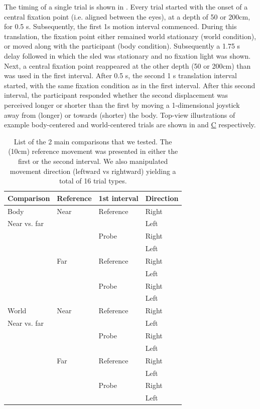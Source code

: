 The timing of a single trial is shown in . Every trial started with the onset of a central fixation point (i.e. aligned between the eyes), at a depth of 50 or 200\si{\centi\metre}, for 0.5 \si{\second}. Subsequently, the first 1\si{\second} motion interval commenced. During this translation, the fixation point either remained world stationary (world condition), or moved along with the participant (body condition).  Subsequently a 1.75 \si{\second} delay followed in which the sled was stationary and no  fixation light was shown. Next, a central fixation point reappeared at the other depth (50 or 200\si{\centi\metre}) than was used in the first interval. After 0.5 \si{\second}, the second 1 \si{\second} translation interval started, with the same fixation condition as in the first interval. After this second interval, the participant responded whether the second displacement was perceived longer or shorter than the first by moving a 1-dimensional joystick away from (longer) or towards (shorter) the body. Top-view illustrations of example body-centered and world-centered trials are shown in  and \hyperref[p4:fig1]{C} respectively.

\begin{table}
    \begin{tabular}{llll}
    Comparison & Reference & 1st interval & Direction \\
    \hline
    Body & Near & Reference & Right \\
    Near vs. far & & & Left \\
    & & Probe & Right \\
    & & & Left \\
    \cline{2-4}
	& Far & Reference & Right \\
    & & & Left \\
    & & Probe & Right \\
    & & & Left \\
    \hline
    World & Near & Reference & Right \\
    Near vs. far & & & Left \\
    & & Probe & Right \\
    & & & Left \\
    \cline{2-4}
	& Far & Reference & Right \\
    & & & Left \\
    & & Probe & Right \\
    & & & Left \\
    \end{tabular}

    \caption{List of the 2 main comparisons that we tested. The (10cm) reference movement was presented in either the first or the second interval. We also manipulated movement direction (leftward vs rightward) yielding a total of 16 trial types.}

    \label{p4:tab1}
\end{table}

